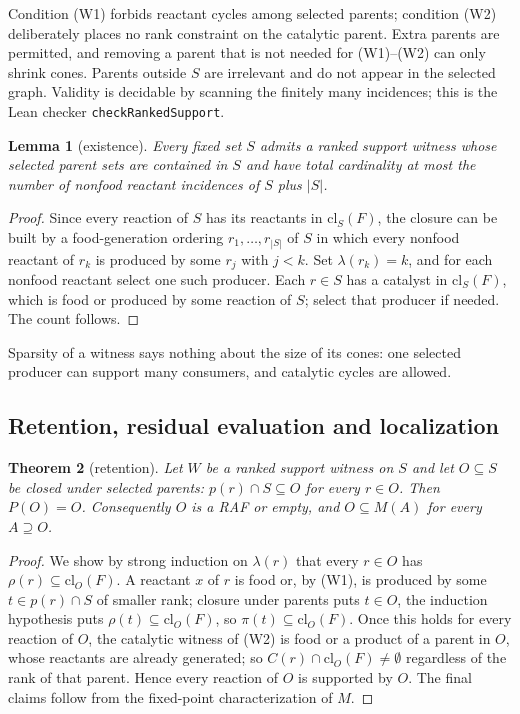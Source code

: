 \documentclass[11pt,a4paper]{article}
\theoremstyle{plain}
\newtheorem{theorem}{Theorem}[section]
\newtheorem{lemma}[theorem]{Lemma}
\theoremstyle{definition}
\theoremstyle{remark}
\newcommand{\cl}{\mathrm{cl}}
\newcommand{\lean}[1]{\texttt{#1}}
\begin{document}
Condition (W1) forbids reactant cycles among selected parents; condition (W2) deliberately places no rank constraint on the catalytic parent. Extra parents are permitted, and removing a parent that is not needed for (W1)--(W2) can only shrink cones. Parents outside $S$ are irrelevant and do not appear in the selected graph. Validity is decidable by scanning the finitely many incidences; this is the Lean checker \lean{checkRankedSupport}.

\begin{lemma}[existence]\label{lem:existence}
Every fixed set $S$ admits a ranked support witness whose selected parent sets are contained in $S$ and have total cardinality at most the number of nonfood reactant incidences of $S$ plus $|S|$.
\end{lemma}

\begin{proof}
Since every reaction of $S$ has its reactants in $\cl_S(F)$, the closure can be built by a food-generation ordering $r_1,\dots,r_{|S|}$ of $S$ in which every nonfood reactant of $r_k$ is produced by some $r_j$ with $j<k$. Set $\lambda(r_k)=k$, and for each nonfood reactant select one such producer. Each $r\in S$ has a catalyst in $\cl_S(F)$, which is food or produced by some reaction of $S$; select that producer if needed. The count follows.
\end{proof}

Sparsity of a witness says nothing about the size of its cones: one selected producer can support many consumers, and catalytic cycles are allowed.

\subsection{Retention, residual evaluation and localization}

\begin{theorem}[retention]\label{thm:retention}
Let $W$ be a ranked support witness on $S$ and let $O\subseteq S$ be closed under selected parents: $p(r)\cap S\subseteq O$ for every $r\in O$. Then $P(O)=O$. Consequently $O$ is a RAF or empty, and $O\subseteq M(A)$ for every $A\supseteq O$.
\end{theorem}

\begin{proof}
We show by strong induction on $\lambda(r)$ that every $r\in O$ has $\rho(r)\subseteq\cl_O(F)$. A reactant $x$ of $r$ is food or, by (W1), is produced by some $t\in p(r)\cap S$ of smaller rank; closure under parents puts $t\in O$, the induction hypothesis puts $\rho(t)\subseteq\cl_O(F)$, so $\pi(t)\subseteq\cl_O(F)$. Once this holds for every reaction of $O$, the catalytic witness of (W2) is food or a product of a parent in $O$, whose reactants are already generated; so $C(r)\cap\cl_O(F)\neq\emptyset$ regardless of the rank of that parent. Hence every reaction of $O$ is supported by $O$. The final claims follow from the fixed-point characterization of $M$.
\end{proof}
\end{document}
